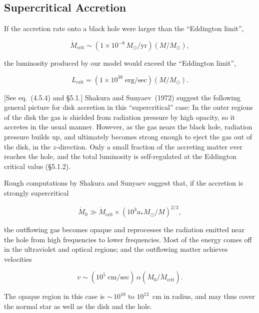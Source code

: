
\subsection{Supercritical Accretion}
\label{sec:5.13}

If the accretion rate onto a black hole were larger than the ``Eddington limit'',

\begin{equation}
\dot{M}_{\text{crit}} \sim (1 \times 10^{-8}\, M_\odot/\text{yr})(M/M_\odot),
\tag{5.13.1}
\end{equation}

the luminosity produced by our model would exceed the ``Eddington limit'',

\begin{equation}
L_{\text{crit}} = (1 \times 10^{38}\;\text{erg/sec})(M/M_\odot).
\tag{5.13.2}
\end{equation}

[See eq.~(4.5.4) and \S5.1.] Shakura and Sunyaev~(1972) \cite{ShakuraSunyaev1972} suggest the following
general picture for disk accretion in this ``supercritical'' case: In the outer regions
of the disk the gas is shielded from radiation pressure by high opacity, so it
accretes in the usual manner. However, as the gas nears the black hole, radiation
pressure builds up, and ultimately becomes strong enough to eject the gas out of
the disk, in the $z$-direction. Only a small fraction of the accreting matter ever
reaches the hole, and the total luminosity is self-regulated at the Eddington
critical value (\S5.1.2).

Rough computations by Shakura and Sunyaev suggest that, if the accretion
is strongly supercritical

\[
\dot{M}_0 \gg \dot{M}_{\text{crit}} \times (10^3 a_* M_\odot / M)^{2/3},
\]

the outflowing gas becomes opaque and reprocesses the radiation emitted near
the hole from high frequencies to lower frequencies. Most of the energy comes
off in the ultraviolet and optical regions; and the outflowing matter achieves
velocities

\[
v \sim (10^5 \;\text{cm/sec})\, \alpha (\dot{M}_0 / \dot{M}_{\text{crit}}).
\]

The opaque region in this case is ${\sim}\,10^{10}$ to $10^{12}$~cm in radius, and may thus
cover the normal star as well as the disk and the hole.

